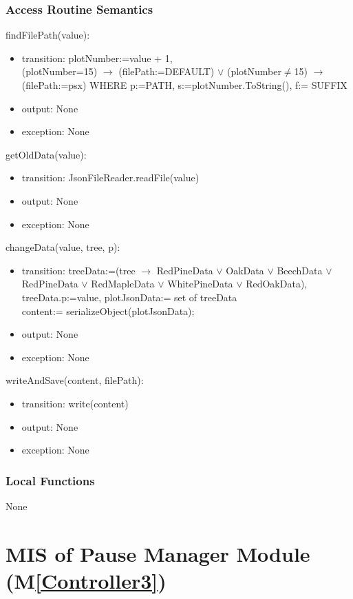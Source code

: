 \documentclass[12pt, titlepage]{article}
\newcommand{\mref}[1]{M\ref{#1}}
\begin{document}
\subsubsection{Access Routine Semantics}

\noindent findFilePath(value):
\begin{itemize}
\item transition: plotNumber:=value + 1,\\
(plotNumber=15) $\rightarrow$ (filePath:=DEFAULT) $\lor$ (plotNumber$\neq$15) $\rightarrow$ (filePath:=psx) WHERE p:=PATH, s:=plotNumber.ToString(), f:= SUFFIX\\
\item output: None
\item exception: None
\end{itemize}
\noindent getOldData(value):
\begin{itemize}
\item transition: JsonFileReader.readFile(value)
\item output: None
\item exception: None
\end{itemize}
\noindent changeData(value, tree, p):
\begin{itemize}
\item transition: treeData:=(tree $\rightarrow$ RedPineData $\lor$ OakData
$\lor$ BeechData
$\lor$ RedPineData
$\lor$ RedMapleData
$\lor$ WhitePineData
$\lor$ RedOakData),\\
treeData.p:=value, plotJsonData:= set of treeData\\
content:= serializeObject(plotJsonData);
\item output: None
\item exception: None
\end{itemize}
\noindent writeAndSave(content, filePath):
\begin{itemize}
\item transition: write(content)
\item output: None
\item exception: None
\end{itemize}

\subsubsection{Local Functions}
None

  \newpage

\section{MIS of Pause Manager Module (\mref{Controller3})}
\end{document}
